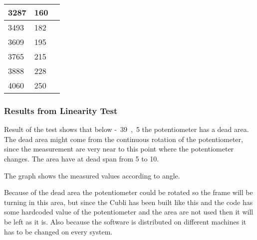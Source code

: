 \begin{table}[H]
\begin{tabular}{|l|l|p{4.3cm}|}
		3287                              			  & 160               \\
		\hline%
		3493                                          & 182               \\
		\hline%
		3609 										  & 195               \\
		\hline%
		3765 										  & 215               \\
		\hline%
		3888 										  & 228               \\
		\hline%
		4060 										  & 250               \\
		\hline%
				
	\end{tabular}
\end{table}


\subsubsection{Results from Linearity Test}
Result of the test shows that below \si{-39,5^{\circ}} the potentiometer has a dead area. The dead area might come from the continuous rotation of the potentiometer, since the measurement are very near to this point where the potentiometer changes. The area have at dead span from \si{5^{\circ}} to \si{10^{\circ}}.

The graph shows the measured values according to angle.

Because of the dead area the potentiometer could be rotated so the frame will be turning in this area, but since the Cubli has been built like this and the code has some hardcoded value of the potentiometer and the area are not used then it will be left as it is. Also because the software is distributed on different machines it has to be changed on every system.


